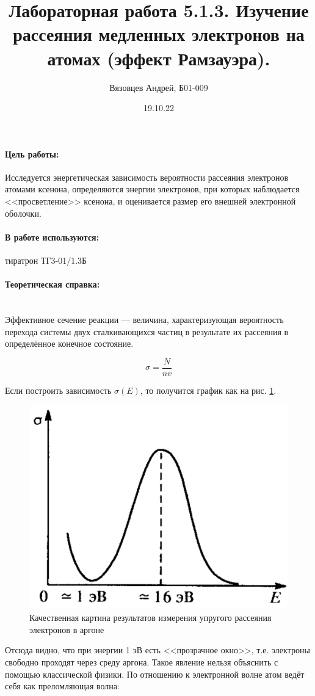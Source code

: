 \documentclass[a4paper, 12pt]{article}
\author{Вязовцев Андрей, Б01-009}
\date{19.10.22}
\title{Лабораторная работа 5.1.3. Изучение рассеяния медленных электронов на атомах (эффект Рамзауэра).}
\newcommand{\parag}[1]{\paragraph*{#1:}}
\begin{document}
\maketitle

\parag {Цель работы}  Исследуется энергетическая зависимость вероятности рассеяния электронов атомами ксенона, определяются энергии электронов, при которых наблюдается <<просветление>> ксенона, и оценивается размер его внешней электронной оболочки. 

\parag {В работе используются} тиратрон ТГ3-01/1.3Б

\parag {Теоретическая справка} ~\\

Эффективное сечение реакции --- величина, характеризующая вероятность перехода системы двух сталкивающихся частиц в результате их рассеяния в определённое конечное состояние.

\begin{equation}
    \sigma = \frac{N}{nv}
\end{equation}

Если построить зависимость $\sigma (E)$, то получится график как на рис. \ref{pic:sigE}.

\begin{figure}[!h]
    \includegraphics[scale = 0.3]{sig_e}
    \centering
    \caption{Качественная картина результатов измерения упругого рассеяния электронов в аргоне}
    \label{pic:sigE}
\end{figure}

Отсюда видно, что при энергии 1 эВ есть <<прозрачное окно>>, т.е. электроны свободно проходят через среду аргона. Такое явление нельзя объяснить с помощью классической физики. По отношению к электронной волне атом ведёт себя как преломляющая волна:
\end{document}
